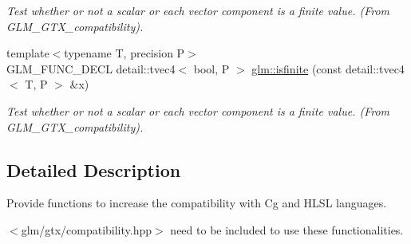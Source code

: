\begin{CompactItemize}
\begin{CompactList}\small\item\em Test whether or not a scalar or each vector component is a finite value. (From GLM\_\-GTX\_\-compatibility). \item\end{CompactList}\item 
\hypertarget{group__gtx__compatibility_ge59390271d8c4e729b3c7bb42052108d}{
{\footnotesize template$<$typename T, precision P$>$ }\\GLM\_\-FUNC\_\-DECL detail::tvec4$<$ bool, P $>$ \hyperlink{group__gtx__compatibility_ge59390271d8c4e729b3c7bb42052108d}{glm::isfinite} (const detail::tvec4$<$ T, P $>$ \&x)}
\label{group__gtx__compatibility_ge59390271d8c4e729b3c7bb42052108d}

\begin{CompactList}\small\item\em Test whether or not a scalar or each vector component is a finite value. (From GLM\_\-GTX\_\-compatibility). \item\end{CompactList}\end{CompactItemize}


\subsection{Detailed Description}
Provide functions to increase the compatibility with Cg and HLSL languages. 

$<$glm/gtx/compatibility.hpp$>$ need to be included to use these functionalities. 